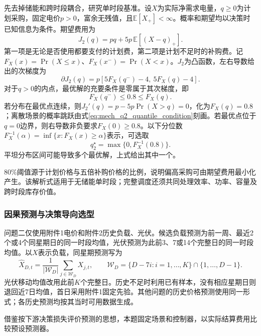 先去掉储能和跨时段耦合，研究单时段基准。设$X$为实际净需求电量，$q\ge0$为计划采购，固定电价$p>0$，富余无残值，且$\mathbb E[X_+]<\infty$。概率和期望均以决策时已知信息为条件。期望费用为
\begin{equation}
 J_2(q)=pq+5p\,\mathbb E[(X-q)_+].
 \label{eq:mech_q2_cost}
\end{equation}
第一项是无论是否使用都要支付的计划费，第二项是计划不足时的补购费。记$F_X(x)=\Pr(X\le x)$、$F_X(x^-)=\Pr(X<x)$。$J_2$为凸函数，左右导数给出的次梯度为
\begin{equation}
 \partial J_2(q)=p[5F_X(q^-)-4,\ 5F_X(q)-4].
 \label{eq:mech_q2_subgradient}
\end{equation}
对于$q>0$的内点，最优解的充要条件是零属于其次梯度，即
\begin{equation}
 F_X(q^-)\le0.8\le F_X(q).
 \label{eq:mech_q2_quantile_condition}
\end{equation}
若分布在最优点连续，则$J_2'(q)=p-5p\Pr(X>q)=0$，化为$F_X(q)=0.8$；离散场景的概率跳跃由式\eqref{eq:mech_q2_quantile_condition}刻画。若最优点位于$q=0$边界，则右导数非负要求$F_X(0)\ge0.8$。以下分位数$F_X^{-1}(\alpha)=\inf\{x:F_X(x)\ge\alpha\}$表示，可选取
\begin{equation}
 q_2^\star=\max\{0,F_X^{-1}(0.8)\}.
 \label{eq:mech_q2_quantile}
\end{equation}
平坦分布区间可能导致多个最优解，上式给出其中一个。

80\%阈值源于计划价格与五倍补购价格的比例，说明偏高采购可由期望费用最小化产生。该解析式适用于无储能单时段；完整调度还须共同处理效率、功率、容量及跨时段库存价值。

\subsubsection{因果预测与决策导向选型}

问题二仅使用附件1电价和附件2历史负载、光伏。候选负载预测为前一周、最近2个或4个同星期日的同一时段均值，光伏预测为此前3、7或14个完整日的同一时段均值。以$X$表示负载，同星期预测写为
\begin{equation}
 \widehat X_{D,t}=\frac{1}{|\mathcal W_D|}\sum_{j\in\mathcal W_D}X_{j,t},\qquad
 \mathcal W_D=\{D-7i:i=1,\ldots,K\}\cap\{1,\ldots,D-1\}.
 \label{eq:weekday_forecast}
\end{equation}
光伏移动均值改用此前$K$个完整日。历史不足时利用已有样本，没有相应星期日则退回近7日均值，首日采用附件1固定先验。其他问题的历史价格预测使用同一形式；各历史预测均按其当时可用数据生成。

借鉴按下游决策损失评价预测的思想\cite{elmachtoub2017spo}，本题固定场景和控制器，以实际结算费用比较预设预测器。

